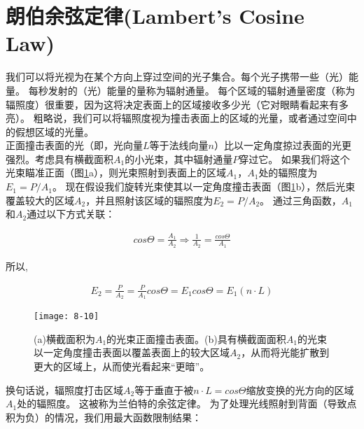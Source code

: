 \section{朗伯余弦定律(Lambert’s Cosine Law)}
\begin{flushleft}
我们可以将光视为在某个方向上穿过空间的光子集合。每个光子携带一些（光）能量。 每秒发射的（光）能量的量称为辐射通量。 每个区域的辐射通量密度（称为辐照度）很重要，因为这将决定表面上的区域接收多少光（它对眼睛看起来有多亮）。 粗略说，我们可以将辐照度视为撞击表面上的区域的光量，或者通过空间中的假想区域的光量。\\

正面撞击表面的光（即，光向量$L$等于法线向量$n$）比以一定角度掠过表面的光更强烈。考虑具有横截面积$A_{1}$的小光束，其中辐射通量$P$穿过它。 如果我们将这个光束瞄准正面（图\ref{fig:8-10}a），则光束照射到表面上的区域$A_{1}$，$A_{1}$处的辐照度为$E_{1}=P/A_{1}$。 现在假设我们旋转光束使其以一定角度撞击表面（图\ref{fig:8-10}b），然后光束覆盖较大的区域$A_{2}$，并且照射该区域的辐照度为$E_{2}=P/A_{2}$。 通过三角函数，$A_{1}$和$A_{2}$通过以下方式关联：\\
\end{flushleft}

\begin{align*}
cos\Theta = \frac{A_{1}}{A_{2}}\Rightarrow \frac{1}{A_{2}}=\frac{cos\Theta}{A_{1}}
\end{align*}

\begin{flushleft}
所以,\\
\end{flushleft}

\begin{align*}
E_{2}=\frac{P}{A_{2}}=\frac{P}{A_{1}}cos\Theta=E_{1}cos\Theta=E_{1}(n\cdot L)
\end{align*}

\begin{figure}[h]
    \label{fig:8-10}
    \texttt{[image: 8-10]}
    \centering
    \caption{(a)横截面积为$A_{1}$的光束正面撞击表面。(b)具有横截面面积$A_{1}$的光束以一定角度撞击表面以覆盖表面上的较大区域$A_{2}$，从而将光能扩散到更大的区域上，从而使光看起来“更暗”。}
\end{figure}

\begin{flushleft}
换句话说，辐照度打击区域$A_{2}$等于垂直于被$n\cdot L=cos\Theta$缩放变换的光方向的区域$A_{1}$处的辐照度。 这被称为兰伯特的余弦定律。 为了处理光线照射到背面（导致点积为负）的情况，我们用最大函数限制结果：\\
\end{flushleft}

